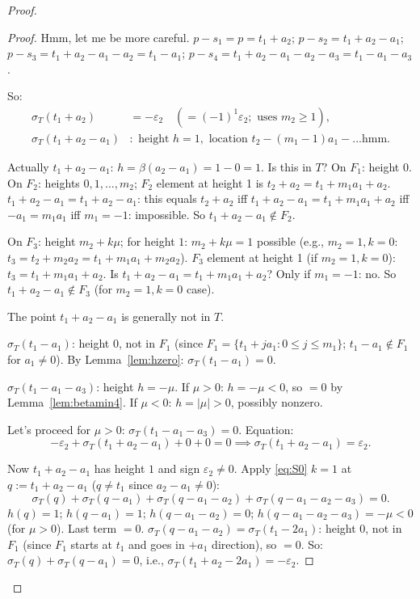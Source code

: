 \begin{proof}
\begin{proof}
Hmm, let me be more careful. $p - s_1 = p = t_1+a_2$; $p - s_2 = t_1+a_2-a_1$; $p-s_3 = t_1+a_2-a_1-a_2 = t_1-a_1$; $p-s_4 = t_1+a_2-a_1-a_2-a_3 = t_1-a_1-a_3$.

So:
\begin{align*}
  \sigma_T(t_1+a_2) &= -\varepsilon_2 \quad (= (-1)^1\varepsilon_2; \text{ uses } m_2\geq 1),\\
  \sigma_T(t_1+a_2-a_1) &: \text{ height } h = 1, \text{ location } t_2 - (m_1-1)a_1 - ... \text{hmm}.
\end{align*}

Actually $t_1+a_2-a_1$: $h = \beta(a_2-a_1) = 1-0 = 1$. Is this in $T$? On $F_1$: height 0. On $F_2$: heights $0,1,\ldots,m_2$; $F_2$ element at height 1 is $t_2+a_2 = t_1+m_1a_1+a_2$. $t_1+a_2-a_1 = t_1+a_2-a_1$: this equals $t_2+a_2$ iff $t_1+a_2-a_1=t_1+m_1a_1+a_2$ iff $-a_1=m_1a_1$ iff $m_1=-1$: impossible. So $t_1+a_2-a_1 \notin F_2$.

On $F_3$: height $m_2+k\mu$; for height $1$: $m_2+k\mu=1$ possible (e.g., $m_2=1,k=0$: $t_3=t_2+m_2a_2=t_1+m_1a_1+m_2a_2$). $F_3$ element at height 1 (if $m_2=1,k=0$): $t_3 = t_1+m_1a_1+a_2$. Is $t_1+a_2-a_1 = t_1+m_1a_1+a_2$? Only if $m_1=-1$: no. So $t_1+a_2-a_1 \notin F_3$ (for $m_2=1,k=0$ case).

The point $t_1+a_2-a_1$ is generally not in $T$.

$\sigma_T(t_1-a_1)$: height 0, not in $F_1$ (since $F_1 = \{t_1+ja_1:0\leq j\leq m_1\}$; $t_1-a_1 \notin F_1$ for $a_1 \neq 0$). By Lemma~\ref{lem:hzero}: $\sigma_T(t_1-a_1)=0$.

$\sigma_T(t_1-a_1-a_3)$: height $h = -\mu$. If $\mu > 0$: $h = -\mu < 0$, so $=0$ by Lemma~\ref{lem:betamin4}. If $\mu < 0$: $h = |\mu| > 0$, possibly nonzero.

Let's proceed for $\mu > 0$: $\sigma_T(t_1-a_1-a_3)=0$. Equation:
\[
  -\varepsilon_2 + \sigma_T(t_1+a_2-a_1) + 0 + 0 = 0 \implies \sigma_T(t_1+a_2-a_1) = \varepsilon_2.
\]

Now $t_1+a_2-a_1$ has height $1$ and sign $\varepsilon_2 \neq 0$. Apply \eqref{eq:S0} $k=1$ at $q := t_1+a_2-a_1$ ($q \neq t_1$ since $a_2-a_1 \neq 0$):
\[
  \sigma_T(q)+\sigma_T(q-a_1)+\sigma_T(q-a_1-a_2)+\sigma_T(q-a_1-a_2-a_3)=0.
\]
$h(q)=1$; $h(q-a_1)=1$; $h(q-a_1-a_2)=0$; $h(q-a_1-a_2-a_3)=-\mu<0$ (for $\mu>0$).
Last term $=0$. $\sigma_T(q-a_1-a_2) = \sigma_T(t_1-2a_1)$: height 0, not in $F_1$ (since $F_1$ starts at $t_1$ and goes in $+a_1$ direction), so $=0$.
So: $\sigma_T(q)+\sigma_T(q-a_1)=0$, i.e., $\sigma_T(t_1+a_2-2a_1)=-\varepsilon_2$.


\end{proof}
\end{proof}
